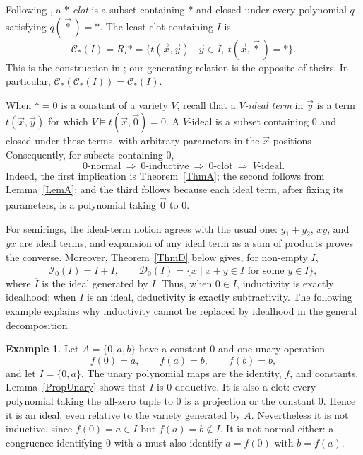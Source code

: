 \documentclass[12pt,english]{amsart}
\theoremstyle{definition}
\newtheorem{example}[theorem]{Example}
\numberwithin{equation}{section}
\theoremstyle{remark}
\newcommand{\clo}[1]{\mathcal{C}_\top(#1)}
\renewcommand{\top}{\ast}
\begin{document}
Following \cite{AU92}, a \emph{$\top$-clot} is a subset containing $\top$ and closed under every polynomial $q$ satisfying $q(\vec\top)=\top$. The least clot containing $I$ is
\[
\clo I=R_I\top
=\{t(\vec x,\vec y)\mid \vec y\in I,\ t(\vec x,\vec\top)=\top\}.
\]
This is the construction in \cite[Propositions 1.3 and 2.2]{AU92}; our generating relation is the opposite of theirs. In particular, $\clo{\clo I}=\clo I$.

When $\top=0$ is a constant of a variety $V$, recall that a \emph{$V$-ideal term} in $\vec y$ is a term $t(\vec x,\vec y)$ for which $V\models t(\vec x,\vec0)=0$. A $V$-ideal is a subset containing $0$ and closed under these terms, with arbitrary parameters in the $\vec x$ positions \cite[Definition 1.2]{AU92}. Consequently, for subsets containing $0$,
\[
0\text{-normal}\ \Longrightarrow\
0\text{-inductive}\ \Longrightarrow\
0\text{-clot}\ \Longrightarrow\
V\text{-ideal}.
\]
Indeed, the first implication is Theorem~\ref{ThmA}; the second follows from Lemma~\ref{LemA}; and the third follows because each ideal term, after fixing its parameters, is a polynomial taking $\vec0$ to $0$.

For semirings, the ideal-term notion agrees with the usual one: $y_1+y_2$, $xy$, and $yx$ are ideal terms, and expansion of any ideal term as a sum of products proves the converse. Moreover, Theorem~\ref{ThmD} below gives, for non-empty $I$,
\[
\mathcal I_0(I)=I+\overline I,
\qquad
\mathcal D_0(I)=\{x\mid x+y\in I\text{ for some }y\in\overline I\},
\]
where $\overline I$ is the ideal generated by $I$. Thus, when $0\in I$, inductivity is exactly idealhood; when $I$ is an ideal, deductivity is exactly subtractivity. The following example explains why inductivity cannot be replaced by idealhood in the general decomposition.

\begin{example}\label{ExIdealDeductive}
Let $A=\{0,a,b\}$ have a constant $0$ and one unary operation
\[
f(0)=a,\qquad f(a)=b,\qquad f(b)=b,
\]
and let $I=\{0,a\}$. The unary polynomial maps are the identity, $f$, and constants. Lemma~\ref{PropUnary} shows that $I$ is $0$-deductive. It is also a clot: every polynomial taking the all-zero tuple to $0$ is a projection or the constant $0$. Hence it is an ideal, even relative to the variety generated by $A$. Nevertheless it is not inductive, since $f(0)=a\in I$ but $f(a)=b\notin I$. It is not normal either: a congruence identifying $0$ with $a$ must also identify $a=f(0)$ with $b=f(a)$.
\end{example}
\end{document}
